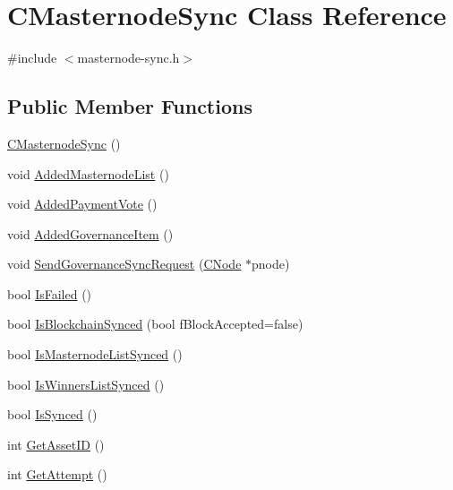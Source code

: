 \hypertarget{class_c_masternode_sync}{}\section{C\+Masternode\+Sync Class Reference}
\label{class_c_masternode_sync}


{\ttfamily \#include $<$masternode-\/sync.\+h$>$}

\subsection*{Public Member Functions}
\begin{DoxyCompactItemize}
\item 
\mbox{\hyperlink{class_c_masternode_sync_aca4714d280b60a9c242d66d055704b43}{C\+Masternode\+Sync}} ()
\item 
void \mbox{\hyperlink{class_c_masternode_sync_a2be4e340948d14759d8ff5d425121dfc}{Added\+Masternode\+List}} ()
\item 
void \mbox{\hyperlink{class_c_masternode_sync_a4277d770f5e204d8283abbf445fa1176}{Added\+Payment\+Vote}} ()
\item 
void \mbox{\hyperlink{class_c_masternode_sync_a4ca0dae22c7fcd5646c47278882f8a84}{Added\+Governance\+Item}} ()
\item 
void \mbox{\hyperlink{class_c_masternode_sync_a2a49c0b49a53084c4e9607a6da541df9}{Send\+Governance\+Sync\+Request}} (\mbox{\hyperlink{class_c_node}{C\+Node}} $\ast$pnode)
\item 
bool \mbox{\hyperlink{class_c_masternode_sync_ac3d7c48a45ff1f330f2333c5a2744c18}{Is\+Failed}} ()
\item 
bool \mbox{\hyperlink{class_c_masternode_sync_a6d1e79d4c07f7ee5d901a0aeb7b73ef9}{Is\+Blockchain\+Synced}} (bool f\+Block\+Accepted=false)
\item 
bool \mbox{\hyperlink{class_c_masternode_sync_ace95eb98d7097c2ccd6ab5ef4e8d1e8f}{Is\+Masternode\+List\+Synced}} ()
\item 
bool \mbox{\hyperlink{class_c_masternode_sync_a744ec19e710b34673475592987615725}{Is\+Winners\+List\+Synced}} ()
\item 
bool \mbox{\hyperlink{class_c_masternode_sync_ab1f58bda356a30a15ae1733e238f188f}{Is\+Synced}} ()
\item 
int \mbox{\hyperlink{class_c_masternode_sync_ab9daeeff90a91ad21205363e26be5b9f}{Get\+Asset\+ID}} ()
\item 
int \mbox{\hyperlink{class_c_masternode_sync_a4114103db21b7a96eb9b3af3fea9c89f}{Get\+Attempt}} ()

\end{DoxyCompactItemize}
